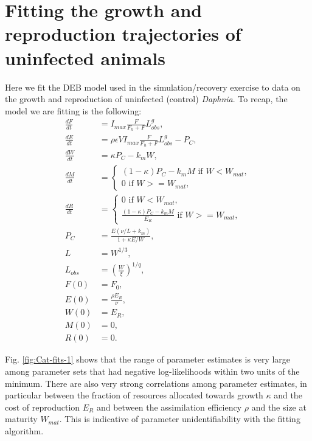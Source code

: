 \documentclass[12pt,reqno,final,pdftex]{amsart}\usepackage[]{graphicx}\usepackage[]{color}
\theoremstyle{plain}
\numberwithin{equation}{part}
\begin{document}
\section*{Fitting the growth and reproduction trajectories of uninfected animals}

Here we fit the DEB model used in the simulation/recovery exercise to data on the growth and reproduction of uninfected (control) \emph{Daphnia}.
To recap, the model we are fitting is the following:
\begin{align}
\frac{dF}{dt} &= I_{max} \frac{F}{F_h+F} L_{obs}^g, \\
\frac{dE}{dt} &= \rho \epsilon V I_{max} \frac{F}{F_h+F} L_{obs}^g - P_C, \\
\frac{dW}{dt} &= \kappa P_C - k_m W, \\
\frac{dM}{dt} &=
\begin{cases}
(1-\kappa) P_C - k_m M \mbox{ if $W < W_{mat}$}, \\
0 \mbox{ if $W >= W_{mat}$},
\end{cases} \\
\frac{dR}{dt} &= \begin{cases} 0 \mbox{ if $W < W_{mat}$}, \\ \frac{(1-\kappa) P_C - k_m M}{E_R} \mbox{ if $W >= W_{mat}$}, \end{cases} \\
P_C &= \frac{E (\nu/L + k_m)}{1 + \kappa E/W}, \\
L &= W^{1/3}, \\
L_{obs} &= (\frac{W}{\xi})^{1/q}, \\
F(0) &= F_0, \\
E(0) &= \frac{\rho E_R}{\nu}, \\
W(0) &= E_R, \\
M(0) &= 0, \\
R(0) &= 0.
\end{align}

Fig. \ref{fig:Cat-fits-1} shows that the range of parameter estimates is very large among parameter sets that had negative log-likelihoods within two units of the minimum.
There are also very strong correlations among parameter estimates, in particular between the fraction of resources allocated towards growth $\kappa$ and the cost of reproduction $E_R$ and between the assimilation efficiency $\rho$ and the size at maturity $W_{mat}$.
This is indicative of parameter unidentifiability with the fitting algorithm.
\end{document}
